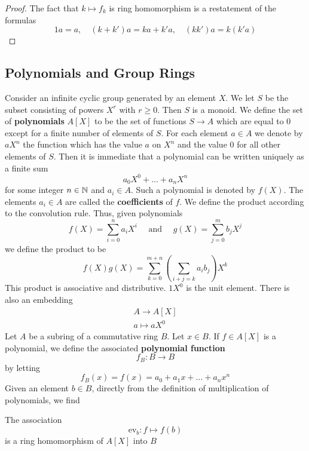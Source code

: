 \documentclass[11pt]{article}
\def \ev {\text{ev}}
\begin{document}
\begin{proof}
The fact that \(k\mapsto f_k\) is ring homomorphism is a restatement of the formulas
\begin{equation*}
1a=a,\quad (k+k')a=ka+k'a,\quad (kk')a=k(k'a)
\end{equation*}
\end{proof}


\subsection{Polynomials and Group Rings}
\label{sec:orga2614c2}
Consider an infinite cyclic group generated by an element \(X\). We let \(S\) be the subset
consisting of powers \(X^r\) with \(r\ge 0\). Then \(S\) is a monoid. We define the set of
\textbf{polynomials} \(A[X]\) to be the set of functions \(S\to A\) which are equal to 0 except for a finite
number  of elements of \(S\). For each element \(a\in A\) we denote by \(aX^n\) the function which
has the value \(a\) on \(X^n\) and the value 0 for all other elements of \(S\). Then it is
immediate that a polynomial can be written uniquely as a finite sum
\begin{equation*}
a_0X^0+\dots+a_nX^n
\end{equation*}
for some integer \(n\in\mathbb{N}\) and  \(a_i\in A\). Such a polynomial is denoted by \(f(X)\). The
elements \(a_i\in A\) are called the \textbf{coefficients} of \(f\). We define the product according to the
convolution rule. Thus, given polynomials
\begin{equation*}
f(X)=\sum_{i=0}^na_iX^i \quad\text{ and }\quad g(X)=\sum_{j=0}^mb_jX^j
\end{equation*}
we define the product to be
\begin{equation*}
f(X)g(X)=\sum_{k=0}^{m+n}\left( \sum_{i+j=k}a_ib_j \right)X^k
\end{equation*}
This product is associative and distributive. \(1X^0\) is the unit element.  There is also an
embedding
\begin{gather*}
A\to A[X]\\
a\mapsto aX^0
\end{gather*}
Let \(A\) be a subring of a commutative ring \(B\). Let \(x\in B\). If \(f\in A[X]\) is a polynomial,
we define the associated \textbf{polynomial function}
\begin{equation*}
f_B:B\to B
\end{equation*}
by letting
\begin{equation*}
f_B(x)=f(x)=a_0+a_1x+\dots+a_nx^n
\end{equation*}
Given an element \(b\in B\), directly from the definition of multiplication of polynomials, we find
\begin{proposition}[]
The association
\begin{equation*}
\ev_b:f\mapsto f(b)
\end{equation*}
is a ring homomorphism of \(A[X]\) into \(B\)
\end{proposition}
\end{document}
